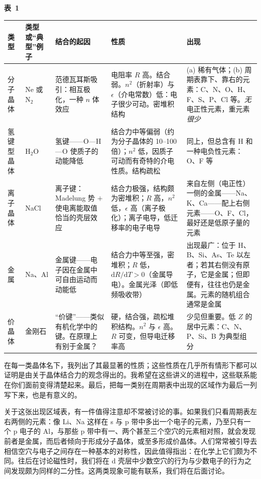 \begin{table}[htbp]
\centering
{\bfseries 表~1}\\[6pt]
\small
\setlength{\tabcolsep}{3.5pt}
\renewcommand{\arraystretch}{1.2}
\begin{tabular}{@{}p{1.35cm}p{1.75cm}p{3.5cm}p{3.85cm}p{3.9cm}@{}}
\toprule
类型 & 类型或“典型”例子 & 结合的起因 & 性质 & 出现 \\
\midrule
分子晶体 & Ne 或 N$_2$ & 范德瓦耳斯吸引：相互极化，一种 $n$ 体效应 & 电阻率 $R$ 高。结合弱。$n^2$（折射率）与 $\epsilon$（介电常数）低：电子很少可动。密堆积结构 & (a) 稀有气体；(b) 周期表靠下、靠右的元素：C、N、O、H、F、S、P、Cl 等。\emph{无}电正性元素，重元素\emph{很少} \\
氢键型晶体 & H$_2$O & 氢键——O—H—O 使质子的动能降低 & 结合力中等偏弱（约为分子晶体的 10--100 倍）；$n^2$ 低，因质子可动而有奇特的介电性质。结构疏松 & 同上，但总含有 H 和一种电负性元素：O、F 等 \\
离子晶体 & NaCl & 离子键：Madelung 势 $+$ 使电离能取值恰当的壳层效应 & 结合力极强，结构颇为密堆积；$R$ 高，$n^2$ 低，$\epsilon$ 高（离子极化）；离子电导，低迁移率的电子电导 & 来自左侧（电正性）一侧的金属——Na、K、Ca——配上右侧元素——O、F、Cl，最好还是低原子量的元素 \\
金属 & Na、Al & 金属键——电子因在金属中可自由运动而动能低 & 结合力中等至强，密堆积；$R$ 低，$\mathrm{d}R/\mathrm{d}T>0$（金属导电）。金属光泽（即低频吸收带） & 出现最广：位于 H、B、Si、As、Te 以左者；若其右侧没有原子，它是金属；但即便有，往往也仍是金属。元素的随机组合通常是金属 \\
价晶体 & 金刚石 & “价键”——类似有机化学中的键。在原理上有别于金属？ & 硬，结合强，疏松堆积结构。$n^2$ 与 $\epsilon$ 高。$R$ 可变，但导电迁移率高 & 少见但重要。低 $Z$ 的居中元素：C、N、P、Si、B 为典型组分 \\
\bottomrule
\end{tabular}
\end{table}

在每一类晶体名下，我列出了其最显著的性质；这些性质在几乎所有情形下都可以证明是由关于晶体结合力的观念得出的。我希望在这些讲义的进程中，这些联系能在你们面前变得清楚起来。最后，把每一类别在周期表中出现的区域作为最后一列写下来，也是有意义的。

关于这张出现区域表，有一件值得注意却不常被讨论的事。如果我们只看周期表左右两侧的元素：像 Li、Na 这样在 s 与 p 带中多出一个电子的元素，乃至只有一个 p 电子的 Al，与那些 p 带中有一、两个甚至三个空穴的元素相对照，就会发现前者是金属，而后者倾向于形成分子晶体，或至多形成价晶体。人们常常被引导去相信空穴与电子之间存在一种基本的对称性，因此值得指出：在化学上它们颇为不同。往后在讨论磁性时，我们将在 d 壳层中少数空穴的行为与少数电子的行为之间发现颇为同样的二分性。这两类现象可能有联系，我们将在后面讨论。

